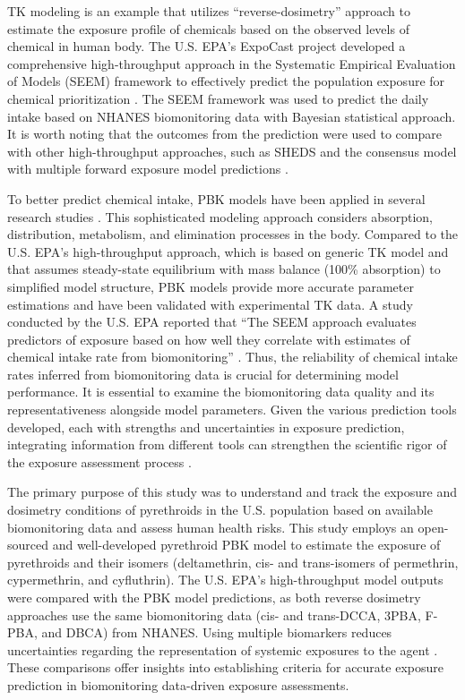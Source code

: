 \documentclass[toxics,article,submit,pdftex,moreauthors]{Definitions/mdpi}
\begin{document}
TK modeling is an example that utilizes ``reverse-dosimetry'' approach to
estimate the exposure profile of chemicals
\citep{egeghy2011assessment, lin2023reconstructing} based on the
observed levels of chemical in human body. The U.S. EPA's ExpoCast
project developed a comprehensive high-throughput approach in the
Systematic Empirical Evaluation of Models (SEEM) framework to
effectively predict the population exposure for chemical prioritization
\citep{wambaugh2013high, stanfield2022bayesian}. The SEEM framework was
used to predict the daily intake based on NHANES biomonitoring data with
Bayesian statistical approach. It is worth noting that the outcomes from
the prediction were used to compare with other high-throughput
approaches, such as SHEDS \citep{isaacs2014sheds} and the consensus
model with multiple forward exposure model predictions
\citep{ring2018consensus}.

To better predict chemical intake, PBK models
have been applied in several research studies \citep{tan2006use, allen2007use,
lyons2008computational, tornero2012pharmacokinetic, moreau2017using}. This
sophisticated modeling approach considers absorption, distribution, metabolism,
and elimination processes in the body. Compared to the U.S. EPA's
high-throughput approach, which is based on generic TK model and that assumes
steady-state equilibrium with mass balance (100\% absorption) to simplified
model structure, PBK models provide more accurate parameter estimations and
have been validated with experimental TK data. A study conducted by the U.S.
EPA reported that ``The SEEM approach evaluates predictors of exposure based on
how well they correlate with estimates of chemical intake rate from
biomonitoring'' \citep{ring2018consensus}. Thus, the reliability of chemical
intake rates inferred from biomonitoring data is crucial for determining model
performance. It is essential to examine the biomonitoring data quality and its
representativeness alongside model parameters. Given the various prediction
tools developed, each with strengths and uncertainties in exposure prediction,
integrating information from different tools can strengthen the scientific
rigor of the exposure assessment process \citep{moreau2017using}.

The primary purpose of this study was to understand and track the
exposure and dosimetry conditions of pyrethroids in the U.S. population
based on available biomonitoring data and assess human health risks.
This study employs an open-sourced and well-developed pyrethroid PBK
model to estimate the exposure of pyrethroids and their isomers
(deltamethrin, cis- and trans-isomers of permethrin, cypermethrin, and
cyfluthrin). The U.S. EPA's high-throughput model outputs were compared
with the PBK model predictions, as both reverse dosimetry approaches use
the same biomonitoring data (cis- and trans-DCCA, 3PBA, F-PBA, and DBCA)
from NHANES. Using multiple biomarkers reduces uncertainties regarding
the representation of systemic exposures to the agent
\citep{lin2023reconstructing}. These comparisons offer insights into
establishing criteria for accurate exposure prediction in biomonitoring
data-driven exposure assessments.
\end{document}
